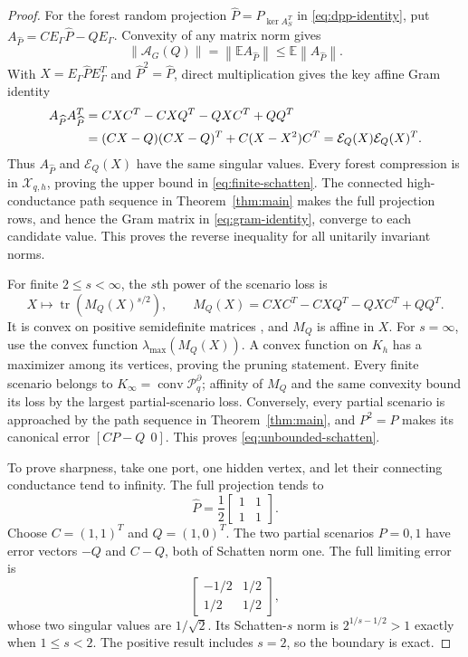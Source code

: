 \documentclass[journal,10pt]{IEEEtran}
\theoremstyle{definition}
\theoremstyle{remark}
\newcommand{\conv}{\operatorname{conv}}
\newcommand{\tr}{\operatorname{tr}}
\newcommand{\cX}{\mathcal X}
\newcommand{\cP}{\mathcal P}
\newcommand{\cE}{\mathcal E}
\newcommand{\cA}{\mathcal A}
\newcommand{\norm}[1]{\left\lVert #1\right\rVert}
\begin{document}
\begin{proof}
For the forest random projection $\widehat P=P_{\ker A_S^T}$ in
\eqref{eq:dpp-identity}, put
$A_{\widehat P}=CE_\Gamma\widehat P-QE_\Gamma$.  Convexity of any matrix norm
gives
\[
  \norm{\cA_G(Q)}
  =\norm{\mathbb E A_{\widehat P}}
  \leq\mathbb E\norm{A_{\widehat P}}.
\]
With $X=E_\Gamma\widehat PE_\Gamma^T$ and $\widehat P^2=\widehat P$, direct
multiplication gives the key affine Gram identity
\begin{align}
  A_{\widehat P}A_{\widehat P}^T
  &=CXC^T-CXQ^T-QXC^T+QQ^T \notag\\
  &=(CX-Q)(CX-Q)^T+C(X-X^2)C^T
   =\cE_Q(X)\cE_Q(X)^T.
  \label{eq:gram-identity}
\end{align}
Thus $A_{\widehat P}$ and $\cE_Q(X)$ have the same singular values.  Every
forest compression is in $\cX_{q,h}$, proving the upper bound in
\eqref{eq:finite-schatten}.  The connected high-conductance path sequence in
Theorem~\ref{thm:main} makes the full projection rows, and hence the Gram
matrix in \eqref{eq:gram-identity}, converge to each candidate value.  This
proves the reverse inequality for all unitarily invariant norms.

For finite $2\leq s<\infty$, the $s$th power of the scenario loss is
\[
  X\longmapsto\tr\left(M_Q(X)^{s/2}\right),
  \qquad M_Q(X)=CXC^T-CXQ^T-QXC^T+QQ^T.
\]
It is convex on positive semidefinite matrices \cite{bhatia1997}, and $M_Q$ is affine in $X$.
For $s=\infty$, use the convex function
$\lambda_{\max}(M_Q(X))$.  A convex function on $K_h$ has a maximizer among
its vertices, proving the pruning statement.  Every finite scenario belongs
to $K_\infty=\conv\cP_q^\partial$; affinity of $M_Q$ and the same convexity
bound its loss by the largest partial-scenario loss.  Conversely, every
partial scenario is approached by the path sequence in
Theorem~\ref{thm:main}, and $P^2=P$ makes its canonical error
$[CP-Q\ \ 0]$.  This proves \eqref{eq:unbounded-schatten}.

To prove sharpness, take one port, one hidden vertex, and let their connecting
conductance tend to infinity.  The full projection tends to
\[
  \widehat P=\frac12\begin{bmatrix}1&1\\1&1\end{bmatrix}.
\]
Choose
$C=(1,1)^T$ and $Q=(1,0)^T$.  The two partial scenarios $P=0,1$ have error
vectors $-Q$ and $C-Q$, both of Schatten norm one.  The full limiting error is
\[
  \begin{bmatrix}-1/2&1/2\\1/2&1/2\end{bmatrix},
\]
whose two singular values are $1/\sqrt2$.  Its Schatten-$s$ norm is
$2^{1/s-1/2}>1$ exactly when $1\leq s<2$.  The positive result includes
$s=2$, so the boundary is exact.
\end{proof}
\end{document}
